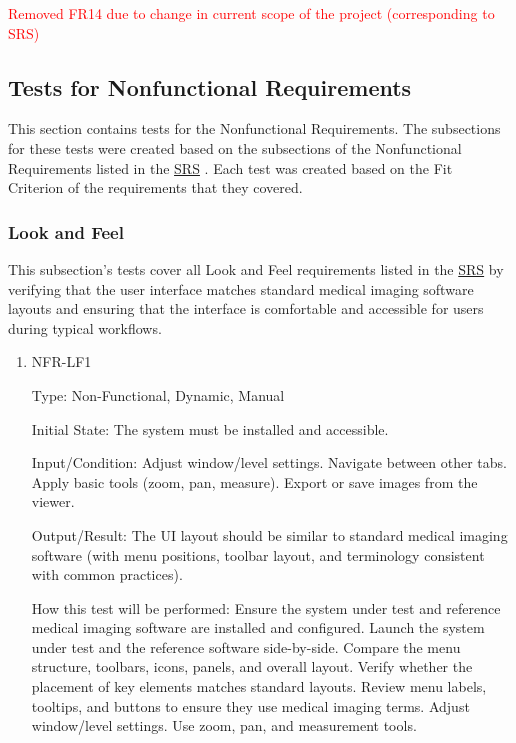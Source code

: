 \documentclass[12pt, titlepage]{article}
\begin{document}
\begin{enumerate}
\textcolor{red}{Removed FR14 due to change in current scope of the project (corresponding to SRS)}

\subsection{Tests for Nonfunctional Requirements}

This section contains tests for the Nonfunctional Requirements. The subsections for these tests were created based on the subsections of the Nonfunctional Requirements listed in the \href{https://github.com/RezaJodeiri/CXR-Capstone/blob/main/docs/SRS/SRS.pdf}{SRS} \citep{SRS}
. Each test was created based on the Fit Criterion of the requirements that they covered.

\subsubsection{Look and Feel}

This subsection's tests cover all Look and Feel requirements listed in the \href{https://github.com/RezaJodeiri/CXR-Capstone/blob/main/docs/SRS/SRS.pdf}{SRS} \citep{SRS}
 by verifying that the user interface matches standard medical imaging software layouts and ensuring that the interface is comfortable and accessible for users during typical workflows.

\begin{enumerate}

\item{NFR-LF1\\}\label{NFR-LF1}

Type: Non-Functional, Dynamic, Manual

Initial State: The system must be installed and accessible.

Input/Condition: Adjust window/level settings. Navigate between other tabs. Apply basic tools (zoom, pan, measure). Export or save images from the viewer.

Output/Result: The UI layout should be similar to standard medical imaging software (with menu positions, toolbar layout, and terminology consistent with common practices).

How this test will be performed: Ensure the system under test and reference medical imaging software are installed and configured. Launch the system under test and the reference software side-by-side. Compare the menu structure, toolbars, icons, panels, and overall layout. Verify whether the placement of key elements matches standard layouts. Review menu labels, tooltips, and buttons to ensure they use medical imaging terms. Adjust window/level settings. Use zoom, pan, and measurement tools.


\end{enumerate}
\end{enumerate}
\end{document}
